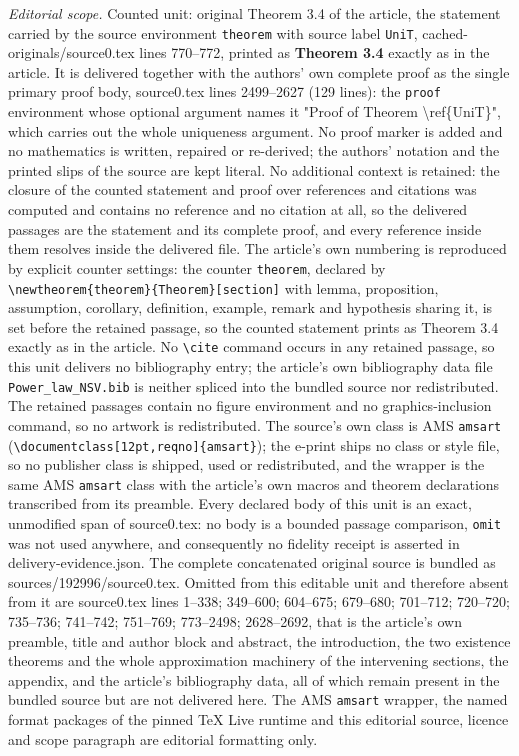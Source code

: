 \documentclass[10pt,a4paper]{amsart}
\theoremstyle{definition}
\begin{document}
\noindent\textit{Editorial scope.} Counted unit: original Theorem 3.4 of the article, the statement carried by the source environment \texttt{theorem} with source label \texttt{UniT}, cached-originals/source0.tex lines 770--772, printed as \textbf{Theorem 3.4} exactly as in the article. It is delivered together with the authors' own complete proof as the single primary proof body, source0.tex lines 2499--2627 (129 lines): the \texttt{proof} environment whose optional argument names it "Proof of Theorem \textbackslash ref\{UniT\}", which carries out the whole uniqueness argument. No proof marker is added and no mathematics is written, repaired or re-derived; the authors' notation and the printed slips of the source are kept literal. No additional context is retained: the closure of the counted statement and proof over references and citations was computed and contains no reference and no citation at all, so the delivered passages are the statement and its complete proof, and every reference inside them resolves inside the delivered file. The article's own numbering is reproduced by explicit counter settings: the counter \texttt{theorem}, declared by \texttt{\textbackslash newtheorem\{theorem\}\{Theorem\}[section]} with lemma, proposition, assumption, corollary, definition, example, remark and hypothesis sharing it, is set before the retained passage, so the counted statement prints as Theorem 3.4 exactly as in the article. No \texttt{\textbackslash cite} command occurs in any retained passage, so this unit delivers no bibliography entry; the article's own bibliography data file \texttt{Power\_law\_NSV.bib} is neither spliced into the bundled source nor redistributed. The retained passages contain no figure environment and no graphics-inclusion command, so no artwork is redistributed. The source's own class is AMS \texttt{amsart} (\texttt{\textbackslash documentclass[12pt,reqno]\{amsart\}}); the e-print ships no class or style file, so no publisher class is shipped, used or redistributed, and the wrapper is the same AMS \texttt{amsart} class with the article's own macros and theorem declarations transcribed from its preamble. Every declared body of this unit is an exact, unmodified span of source0.tex: no body is a bounded passage comparison, \texttt{omit} was not used anywhere, and consequently no fidelity receipt is asserted in delivery-evidence.json. The complete concatenated original source is bundled as sources/192996/source0.tex. Omitted from this editable unit and therefore absent from it are source0.tex lines 1--338; 349--600; 604--675; 679--680; 701--712; 720--720; 735--736; 741--742; 751--769; 773--2498; 2628--2692, that is the article's own preamble, title and author block and abstract, the introduction, the two existence theorems and the whole approximation machinery of the intervening sections, the appendix, and the article's bibliography data, all of which remain present in the bundled source but are not delivered here. The AMS \texttt{amsart} wrapper, the named format packages of the pinned TeX Live runtime and this editorial source, licence and scope paragraph are editorial formatting only.\par\smallskip
\end{document}
